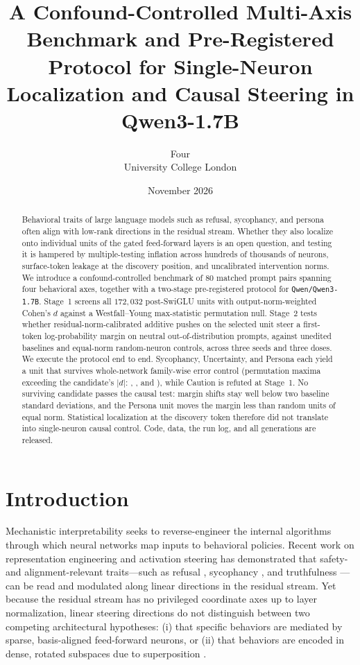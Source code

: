 \documentclass[11pt, a4paper]{article}
\title{\textbf{A Confound-Controlled Multi-Axis Benchmark and Pre-Registered Protocol for Single-Neuron Localization and Causal Steering in Qwen3-1.7B}}
\author{Four\\[2pt] \normalsize University College London}
\date{November 2026}
\begin{document}
\maketitle

\begin{abstract}
Behavioral traits of large language models such as refusal, sycophancy, and persona often align with low-rank directions in the residual stream. Whether they also localize onto individual units of the gated feed-forward layers is an open question, and testing it is hampered by multiple-testing inflation across hundreds of thousands of neurons, surface-token leakage at the discovery position, and uncalibrated intervention norms. We introduce a confound-controlled benchmark of 80 matched prompt pairs spanning four behavioral axes, together with a two-stage pre-registered protocol for \texttt{Qwen/\allowbreak{}Qwen3-1.7B}. Stage~1 screens all $172{,}032$ post-SwiGLU units with output-norm-weighted Cohen's $d$ against a Westfall--Young max-statistic permutation null. Stage~2 tests whether residual-norm-calibrated additive pushes on the selected unit steer a first-token log-probability margin on neutral out-of-distribution prompts, against unedited baselines and equal-norm random-neuron controls, across three seeds and three doses. We execute the protocol end to end. Sycophancy, Uncertainty, and Persona each yield a unit that survives whole-network family-wise error control (permutation maxima exceeding the candidate's $|d|$: \SycExceed, \UncExceed, and \PerExceed), while Caution is refuted at Stage~1. No surviving candidate passes the causal test: margin shifts stay well below two baseline standard deviations, and the Persona unit moves the margin less than random units of equal norm. Statistical localization at the discovery token therefore did not translate into single-neuron causal control. Code, data, the run log, and all generations are released.
\end{abstract}

\section{Introduction}

Mechanistic interpretability seeks to reverse-engineer the internal algorithms through which neural networks map inputs to behavioral policies. Recent work on representation engineering and activation steering has demonstrated that safety- and alignment-relevant traits---such as refusal \cite{arditi2024refusal}, sycophancy \cite{perez2023discovering, sharma2024sycophancy}, and truthfulness \cite{zou2023repe}---can be read and modulated along linear directions in the residual stream. Yet because the residual stream has no privileged coordinate axes up to layer normalization, linear steering directions do not distinguish between two competing architectural hypotheses: (i) that specific behaviors are mediated by sparse, basis-aligned feed-forward neurons, or (ii) that behaviors are encoded in dense, rotated subspaces due to superposition \cite{elhage2022superposition, gurnee2023haystack}.
\end{document}

